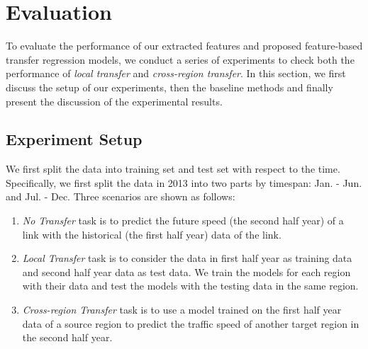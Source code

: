 \documentclass[letterpaper]{article} %
\begin{document}
\section{Evaluation}
To evaluate the performance of our extracted features and proposed feature-based transfer regression models, we conduct a series of experiments to check both the performance of \textit{local transfer} and \textit{cross-region transfer}.
In this section, we first discuss the setup of our experiments, then the baseline methods and finally present the discussion of the experimental results.
\subsection{Experiment Setup}
We first split the data into training set and test set with respect to the time. 
Specifically, we first split the data in 2013 into two parts by timespan: Jan. - Jun. and Jul. - Dec.
Three scenarios are shown as follows:
\begin{enumerate}
	\item \textit{{No Transfer}} task is to predict the future speed  (the second half year) of a link with the historical (the first half year) data of the link.		
	\item \textit{{Local Transfer}} task is to consider the data in first half year as training data and second half year data as test data. 
	We train the models for each region with their data and test the models with the testing data in the same region. 
	\item \textit{{Cross-region Transfer}} task is to use a model trained on the first half year data of a source region to predict the traffic speed of another target region in the second half year.
\end{enumerate}
\end{document}
